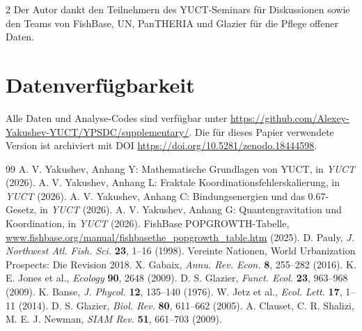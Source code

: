\documentclass[11pt,a4paper]{article}
\begin{document}
\begin{multicols}{2}
		Der Autor dankt den Teilnehmern des YUCT-Seminars für Diskussionen sowie den Teams von FishBase, UN, PanTHERIA und Glazier für die Pflege offener Daten.
		
		\section*{Datenverfügbarkeit}
		
		Alle Daten und Analyse-Codes sind verfügbar unter \url{https://github.com/Alexey-Yakushev-YUCT/YPSDC/supplementary/}. Die für dieses Papier verwendete Version ist archiviert mit DOI \url{https://doi.org/10.5281/zenodo.18444598}.
		
		\begin{thebibliography}{99}
			 A. V. Yakushev, Anhang Y: Mathematische Grundlagen von YUCT, in \emph{YUCT} (2026).
			 A. V. Yakushev, Anhang L: Fraktale Koordinationsfehlerskalierung, in \emph{YUCT} (2026).
			 A. V. Yakushev, Anhang C: Bindungsenergien und das 0.67-Gesetz, in \emph{YUCT} (2026).
			 A. V. Yakushev, Anhang G: Quantengravitation und Koordination, in \emph{YUCT} (2026).
			 FishBase POPGROWTH-Tabelle, \url{www.fishbase.org/manual/fishbasethe_popgrowth_table.htm} (2025).
			 D. Pauly, \emph{J. Northwest Atl. Fish. Sci.} \textbf{23}, 1–16 (1998).
			 Vereinte Nationen, World Urbanization Prospects: Die Revision 2018.
			 X. Gabaix, \emph{Annu. Rev. Econ.} \textbf{8}, 255–282 (2016).
			 K. E. Jones et al., \emph{Ecology} \textbf{90}, 2648 (2009).
			 D. S. Glazier, \emph{Funct. Ecol.} \textbf{23}, 963–968 (2009).
			 K. Banse, \emph{J. Phycol.} \textbf{12}, 135–140 (1976).
			 W. Jetz et al., \emph{Ecol. Lett.} \textbf{17}, 1–11 (2014).
			 D. S. Glazier, \emph{Biol. Rev.} \textbf{80}, 611–662 (2005).
			 A. Clauset, C. R. Shalizi, M. E. J. Newman, \emph{SIAM Rev.} \textbf{51}, 661–703 (2009).
		\end{thebibliography}
		
	\end{multicols}
\end{document}
